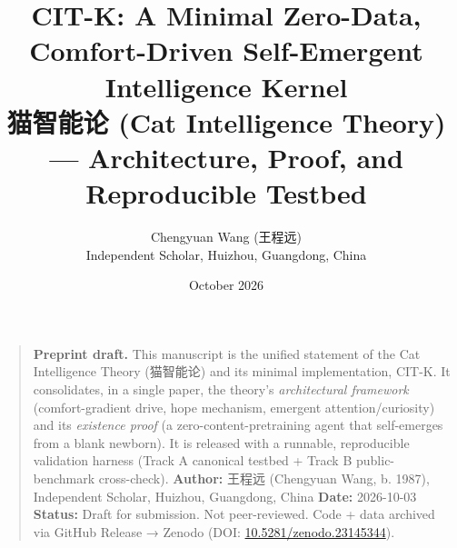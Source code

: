 \documentclass[11pt]{article}
\title{CIT-K: A Minimal Zero-Data, Comfort-Driven Self-Emergent Intelligence Kernel\\ \large 猫智能论 (Cat Intelligence Theory) — Architecture, Proof, and Reproducible Testbed}
\author{Chengyuan Wang (王程远)\\ Independent Scholar, Huizhou, Guangdong, China}
\date{October 2026}
\begin{document}
\maketitle
\begin{quote}
\textbf{Preprint draft.} This manuscript is the unified statement of the Cat Intelligence Theory (猫智能论) and its minimal implementation, CIT-K. It consolidates, in a single paper, the theory's \emph{architectural framework} (comfort-gradient drive, hope mechanism, emergent attention/curiosity) and its \emph{existence proof} (a zero-content-pretraining agent that self-emerges from a blank newborn). It is released with a runnable, reproducible validation harness (Track A canonical testbed + Track B public-benchmark cross-check).
\textbf{Author:} 王程远 (Chengyuan Wang, b. 1987), Independent Scholar, Huizhou, Guangdong, China
\textbf{Date:} 2026-10-03
\textbf{Status:} Draft for submission. Not peer-reviewed. Code + data archived via GitHub Release → Zenodo (DOI: \href{https://doi.org/10.5281/zenodo.23145344}{10.5281/zenodo.23145344}).
\end{quote}
\end{document}
